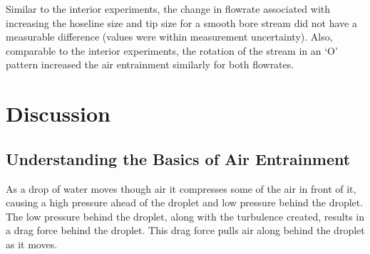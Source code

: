 \documentclass[12pt,oneside]{book}
\begin{document}
Similar to the interior experiments, the change in flowrate associated with increasing the hoseline size and tip size for a smooth bore stream did not have a measurable difference (values were within measurement uncertainty). Also, comparable to the interior experiments, the rotation of the stream in an `O' pattern increased the air entrainment similarly for both flowrates.





\chapter{Discussion}

\section{Understanding the Basics of Air Entrainment}
As a drop of water moves though air it compresses some of the air in front of it, causing a high pressure ahead of the droplet and low pressure behind the droplet. The low pressure behind the droplet, along with the turbulence created, results in a drag force behind the droplet. This drag force pulls air along behind the droplet as it moves.
\end{document}
